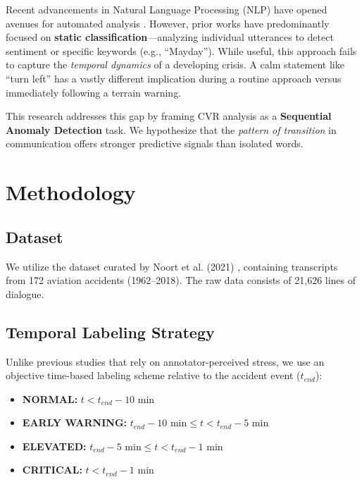 \documentclass[11pt, a4paper]{article}
\begin{document}
Recent advancements in Natural Language Processing (NLP) have opened avenues for automated analysis \cite{devlin2018bert}. However, prior works have predominantly focused on \textbf{static classification}---analyzing individual utterances to detect sentiment or specific keywords (e.g., ``Mayday''). While useful, this approach fails to capture the \textit{temporal dynamics} of a developing crisis. A calm statement like ``turn left'' has a vastly different implication during a routine approach versus immediately following a terrain warning.

This research addresses this gap by framing CVR analysis as a \textbf{Sequential Anomaly Detection} task. We hypothesize that the \textit{pattern of transition} in communication offers stronger predictive signals than isolated words.

\section{Methodology}

\subsection{Dataset}
We utilize the dataset curated by Noort et al. (2021) \cite{noort2021cvr}, containing transcripts from 172 aviation accidents (1962--2018). The raw data consists of 21,626 lines of dialogue.

\subsection{Temporal Labeling Strategy}
Unlike previous studies that rely on annotator-perceived stress, we use an objective time-based labeling scheme relative to the accident event ($t_{end}$):

\begin{itemize}
    \item \textbf{NORMAL:} $t < t_{end} - 10 \text{ min}$
    \item \textbf{EARLY WARNING:} $t_{end} - 10 \text{ min} \le t < t_{end} - 5 \text{ min}$
    \item \textbf{ELEVATED:} $t_{end} - 5 \text{ min} \le t < t_{end} - 1 \text{ min}$
    \item \textbf{CRITICAL:} $t < t_{end} - 1 \text{ min}$
\end{itemize}
\end{document}
